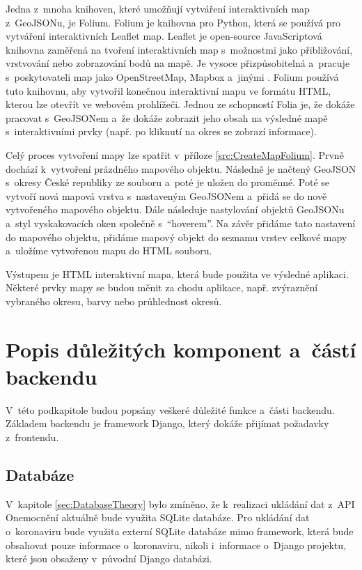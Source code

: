 Jedna z~mnoha knihoven, které umožňují vytváření interaktivních map z~GeoJSONu, je Folium. Folium je knihovna pro Python, která se používá pro vytváření interaktivních Leaflet map. Leaflet je open-source JavaScriptová knihovna zaměřená na tvoření interaktivních map s~možnostmi jako přibližování, vrstvování nebo zobrazování bodů na mapě. Je vysoce přizpůsobitelná a~pracuje s~poskytovateli map jako OpenStreetMap, Mapbox a~jinými \cite{leafletjs-dokumentace}. Folium používá tuto knihovnu, aby vytvořil konečnou interaktivní mapu ve formátu HTML, kterou lze otevřít ve webovém prohlížeči. Jednou ze schopností Folia je, že dokáže pracovat s~GeoJSONem a~že dokáže zobrazit jeho obsah na výsledné mapě s~interaktivními prvky (např. po kliknutí na okres se zobrazí informace).

Celý proces vytvoření mapy lze spatřit v~příloze \ref{src:CreateMapFolium}. Prvně dochází k~vytvoření prázdného mapového objektu. Následně je načtený GeoJSON s~okresy České republiky ze souboru a~poté je uložen do proměnné. Poté se vytvoří nová mapová vrstva s~nastaveným GeoJSONem a~přidá se do nově vytvořeného mapového objektu. Dále následuje nastylování objektů GeoJSONu a~styl vyskakovacích oken společně s~\enquote{hoverem}. Na závěr přidáme tato nastavení do mapového objektu, přidáme mapový objekt do seznamu vrstev celkové mapy a~uložíme vytvořenou mapu do HTML souboru.

Výstupem je HTML interaktivní mapa, která bude použita ve výsledné aplikaci. Některé prvky mapy se budou měnit za chodu aplikace, např. zvýraznění vybraného okresu, barvy nebo průhlednost okresů.

\section{Popis důležitých komponent a~částí backendu}

V~této podkapitole budou popsány veškeré důležité funkce a~části backendu. Základem backendu je framework Django, který dokáže přijímat požadavky z~frontendu.

\subsection{Databáze}

V~kapitole \ref{sec:DatabaseTheory} bylo zmíněno, že k~realizaci ukládání dat z~API Onemocnění aktuálně bude využita SQLite databáze. Pro ukládání dat o~koronaviru bude využita externí SQLite databáze mimo framework, která bude obsahovat pouze informace o~koronaviru, nikoli i~informace o~Django projektu, které jsou obsaženy v~původní Django databázi.

